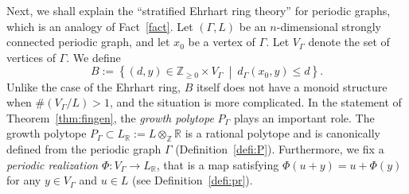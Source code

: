 \documentclass[11pt]{article}
\theoremstyle{definition}
\numberwithin{equation}{section}
\begin{document}
Next, we shall explain the ``stratified Ehrhart ring theory'' for periodic graphs, which is an analogy of Fact~\ref{fact}. 
Let $(\Gamma, L)$ be an $n$-dimensional strongly connected periodic graph, and let $x_0$ be a vertex of $\Gamma$. 
Let $V_{\Gamma}$ denote the set of vertices of $\Gamma$. 
We define 
\[
B := \left \{ (d,y) \in \mathbb{Z}_{\ge 0} \times V_{\Gamma}  \ \middle | \ d_{\Gamma}(x_0, y) \le d \right\}. 
\]
Unlike the case of the Ehrhart ring, $B$ itself does not have a monoid structure when $\# (V_{\Gamma} /L) > 1$, and the situation is more complicated. 
In the statement of Theorem~\ref{thm:fingen}, the \textit{growth polytope} $P_{\Gamma}$ plays an important role. 
The growth polytope $P_{\Gamma} \subset L_{\mathbb{R}} := L \otimes _{\mathbb{Z}} \mathbb{R}$ is a rational polytope and is canonically defined from the periodic graph $\Gamma$ (Definition~\ref{defi:P}). 
Furthermore, we fix a \textit{periodic realization} $\Phi : V_{\Gamma} \to L_{\mathbb{R}}$, that is a map satisfying $\Phi (u + y) = u + \Phi(y)$ for any $y \in V_{\Gamma}$ and $u \in L$ (see Definition~\ref{defi:pr}). 
\end{document}

